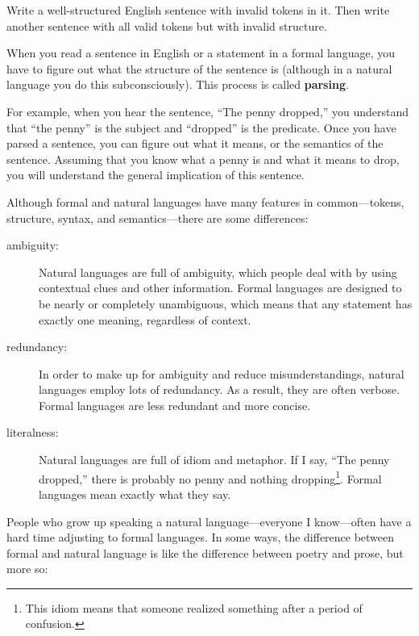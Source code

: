 \documentclass[10pt]{book}
\begin{document}
\begin{ex}
Write a well-structured English sentence with invalid tokens in it.  Then write another sentence with all 
valid tokens but with invalid structure.
\end{ex}

When you read a sentence in English or a statement in a formal language, you have to figure out what the 
structure of the sentence is (although in a natural language you do this subconsciously).  This process 
is called {\bf parsing}.


For example, when you hear the sentence, ``The penny dropped,'' you understand that ``the penny'' is the 
subject and ``dropped'' is the predicate.  Once you have parsed a sentence, you can figure out what it 
means, or the semantics of the sentence.  Assuming that you know what a penny is and what it means to 
drop, you will understand the general implication of this sentence.

Although formal and natural languages have many features in common---tokens, structure, syntax, and 
semantics---there are some differences:


\begin{description}

\item[ambiguity:] Natural languages are full of ambiguity, which people deal with by using contextual 
clues and other information. Formal languages are designed to be nearly or completely unambiguous, which 
means that any statement has exactly one meaning, regardless of context.

\item[redundancy:] In order to make up for ambiguity and reduce misunderstandings, natural languages employ 
lots of redundancy.  As a result, they are often verbose.  Formal languages are less redundant and more 
concise.

\item[literalness:] Natural languages are full of idiom and metaphor. If I say, ``The penny dropped,'' 
there is probably no penny and nothing dropping\footnote{This idiom means that someone realized something 
after a period of confusion.}.  Formal languages mean exactly what they say.

\end{description}

People who grow up speaking a natural language---everyone I know---often have a hard time adjusting to 
formal languages.  In some ways, the difference between formal and natural language is like the 
difference between poetry and prose, but more so:
\end{document}
